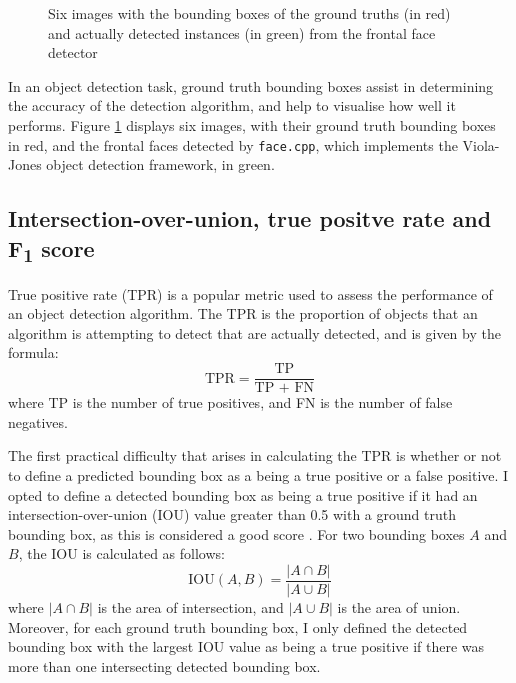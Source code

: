 \documentclass[twocolumn, 10pt, a4paper]{article}
\begin{document}
\begin{figure}[htbp]
  \hfill
  \hfill
  \caption{Six images with the bounding boxes of the ground truths (in red) and actually detected instances (in green) from the frontal face detector}\label{fig:face}
\end{figure}

In an object detection task, ground truth bounding boxes assist in determining the accuracy of the detection algorithm, and help to visualise how well it performs.
Figure \ref{fig:face} displays six images, with their ground truth bounding boxes in red, and the frontal faces detected by \texttt{face.cpp}, which implements the Viola-Jones object detection framework, in green.

\subsection{Intersection-over-union, true positve rate and F\textsubscript{1} score}

True positive rate (TPR) is a popular metric used to assess the performance of an object detection algorithm.
The TPR is the proportion of objects that an algorithm is attempting to detect that are actually detected, and is given by the formula:
\[
  \textrm{TPR} = \frac{\textrm{TP}}{\textrm{TP + FN}}
\]
where TP is the number of true positives, and FN is the number of false negatives.

The first practical difficulty that arises in calculating the TPR is whether or not to define a predicted bounding box as a being a true positive or a false positive.
I opted to define a detected bounding box as being a true positive if it had an intersection-over-union (IOU) value greater than 0.5 with a ground truth bounding box, as this is considered a good score \cite{iou}.
For two bounding boxes $A$ and $B$, the IOU is calculated as follows:
\[
  \textrm{IOU}(A, B) = \frac{|A \cap B|}{|A \cup B|}
\]
where $|A \cap B|$ is the area of intersection, and $|A \cup B|$ is the area of union.
Moreover, for each ground truth bounding box, I only defined the detected bounding box with the largest IOU value as being a true positive if there was more than one intersecting detected bounding box.
\end{document}
